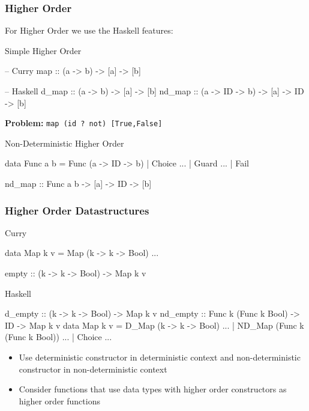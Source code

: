 \documentclass[utf8]{beamer}
\newenvironment{program}{\begin{semiverbatim}\small}{\end{semiverbatim}}
\begin{document}
\begin{frame}[fragile]
\frametitle{Higher Order}

For Higher Order we use the Haskell features:

\begin{block}{Simple Higher Order}
\begin{program}
-- Curry
map :: (a -> b) -> [a] -> [b]

-- Haskell
d_map   :: (a -> b) -> [a] -> [b]
nd_map  :: (a -> ID -> b) -> [a] -> ID -> [b]
\end{program}
\end{block}

{\bf Problem:} \verb!map (id ? not) [True,False]!


\pause

\begin{block}{Non-Deterministic Higher Order}
\begin{program}
data Func a b = Func (a -> ID -> b)
              | Choice ... | Guard  ... | Fail 

nd_map :: Func a b -> [a] -> ID -> [b]
\end{program}
\end{block}
\end{frame}


\begin{frame}[fragile]
\frametitle{Higher Order Datastructures}
\begin{block}{Curry}
\begin{program}
data Map k v = Map (k -> k -> Bool) ...

empty :: (k -> k -> Bool) -> Map k v
\end{program}
\end{block}

\begin{block}{Haskell}
\begin{program}
d_empty  :: (k -> k -> Bool) -> Map k v
nd_empty :: Func k (Func k Bool) -> ID -> Map k v
\pause
data Map k v = D_Map  (k -> k -> Bool) ...
             | ND_Map (Func k (Func k Bool)) ...
             | Choice ...
\end{program}
\end{block}
\begin{itemize}
\item Use deterministic constructor in deterministic context
      and non-deterministic constructor in non-deterministic context
\item Consider functions that use data types with higher order constructors
      as higher order functions
\end{itemize}
\end{frame}
\end{document}
